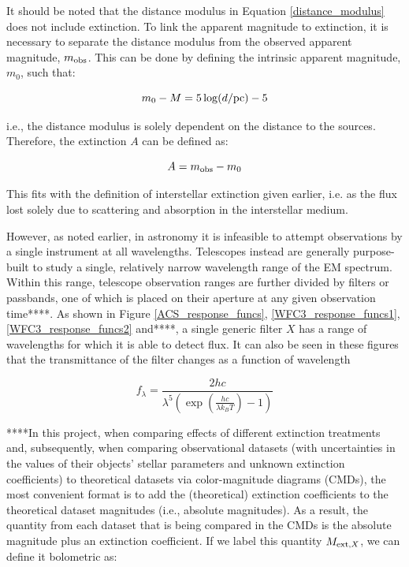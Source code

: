 \documentclass[12pt, a4paper]{report}
\begin{document}
It should be noted that the distance modulus in Equation \ref{distance_modulus} does not include extinction. To link the apparent magnitude to extinction, it is necessary to separate the distance modulus from the observed apparent magnitude, $m_{\textnormal{obs}}$. This can be done by defining the intrinsic apparent magnitude, $m_{0}$, such that:

\begin{equation}
\label{intrinsic_app_mag}
m_{0} - M = 5\log(d/\textnormal{pc}) - 5
\end{equation}

i.e., the distance modulus is solely dependent on the distance to the  sources. Therefore, the extinction $A$ can be defined as:

\begin{equation}
\label{bol_extinc}
A = m_{\textnormal{obs}} - m_{0}
\end{equation}

This fits with the definition of interstellar extinction given earlier, i.e. as the flux lost solely due to scattering and absorption in the interstellar medium.

However, as noted earlier, in astronomy it is infeasible to attempt observations by a single instrument at all wavelengths. Telescopes instead are generally purpose-built to study a single, relatively narrow wavelength range of the EM spectrum. Within this range, telescope observation ranges are further divided by filters or passbands, one of which is placed on their aperture at any given observation time****. As shown in Figure \ref{ACS_response_funcs}, \ref{WFC3_response_funcs1}, \ref{WFC3_response_funcs2} and****, a single generic filter $X$ has a range of wavelengths for which it is able to detect flux. It can also be seen in these figures that the transmittance of the filter changes as a function of wavelength

\begin{equation}
f_{\lambda} = \frac{2hc}{\lambda^{5}\left(\exp\left({\frac{hc}{\lambda k_{B}T}}\right) - 1\right)}
\label{planck_bb}
\end{equation} 

****In this project, when comparing effects of different extinction treatments and, subsequently, when comparing observational datasets (with uncertainties in the values of their objects' stellar parameters and unknown extinction coefficients) to theoretical datasets via color-magnitude diagrams (CMDs), the most convenient format is to add the (theoretical) extinction coefficients to the theoretical dataset magnitudes (i.e., absolute magnitudes). As a result, the quantity from each dataset that is being compared in the CMDs is the absolute magnitude plus an extinction coefficient. If we label this quantity $M_{\textnormal{ext},X}$, we can define it bolometric as:
\end{document}
